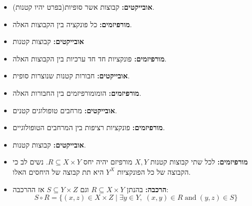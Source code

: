 \documentclass{tstextbook}
\begin{document}
\begin{definition}
  \begin{itemize}
    \item \textbf{אובייקטים:} קבוצות אשר סופיות(בפרט יהיו קטנות).
    \item \textbf{מורפיזמים:} כל פונקציה בין הקבוצות האלה.
  \end{itemize}
\end{definition}
\begin{definition}
  \begin{itemize}
    \item \textbf{אובייקטים:} קבוצות קטנות
    \item \textbf{מורפיזמים:} פונקציות חד חד ערכיות בין הקבוצות האלה.
  \end{itemize}
\end{definition}
\begin{definition}
  \begin{itemize}
    \item \textbf{אובייקטים:} חבורות קטנות שנוצרות סופית.
    \item \textbf{מורפיזמים:} הומומורפיזמים בין החבורות האלה.
  \end{itemize}
\end{definition}
\begin{definition}
  \begin{itemize}
    \item \textbf{אובייקטים:} מרחבים טופולוגים קטנים.
    \item \textbf{מורפיזמים:} פונקציות רציפות בין המרחבים הטופולוגיים.
  \end{itemize}
\end{definition}
\begin{definition}
  \begin{itemize}
    \item \textbf{אובייקטים:} קבוצות קטנות.
    \item \textbf{מורפיזמים:} לכל שתי קבוצות קטנות \(X,Y\) מורפיזם יהיה יחס \(R\subseteq X\times Y\). נשים לב כי הקבוצה של כל הפונקציות \(Y^{X}\) היא תת קבוצה של היחסים האלו.
    \item \textbf{הרכבה:} בהנתן \(R\subseteq X \times Y\) וגם \(S\subseteq Y \times Z\) אז ההרכבה:
$$S\circ R=\{(x,z)\in X\times Z\mid\exists y\in Y,\;(x,y)\in R\;{\mathrm{and}}\;(y,z)\in S\}$$
  \end{itemize}
\end{definition}
\end{document}
